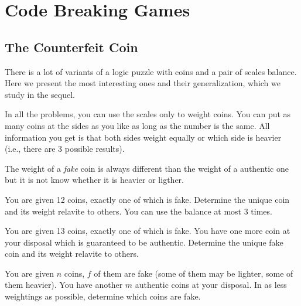 \chapter{Code Breaking Games}


\section{The Counterfeit Coin}

There is a lot of variants of a logic puzzle with coins and a pair of scales balance.
Here we present the most interesting ones and their generalization, which we study in the sequel.

In all the problems, you can use the scales only to weight coins.
You can put as many coins at the sides as you like as long as the number is the same.
All information you get is that both sides weight equally or which side is heavier (i.e., there are 3 possible results).

The weight of a \emph{fake} coin is always different than
the weight of a authentic one
but it is not know whether it is heavier or ligther.

\begin{problem}
You are given 12 coins, exactly one of which is fake.
Determine the unique coin and its weight relavite to others.
You can use the balance at most 3 times.
\end{problem}

\begin{problem}
You are given 13 coins, exactly one of which is fake.
You have one more coin at your disposal which is guaranteed to be authentic.
Determine the unique fake coin and its weight relavite to others.
\end{problem}

\begin{problem}
You are given $n$ coins, $f$ of them are fake (some of them may be lighter, some of them heavier).
You have another $m$ authentic coins at your disposal.
In as less weightings as possible, determine which coins are fake.
\end{problem}

